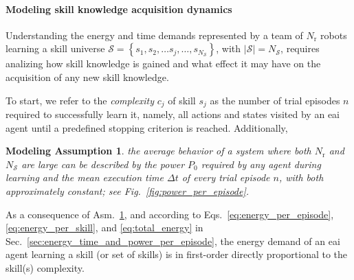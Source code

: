 \documentclass[12pt]{article}
\renewcommand{\emph}[1]{\textit{#1}}
\newtheorem{assumption}{Modeling Assumption}
\begin{document}
\paragraph*{Modeling skill knowledge acquisition dynamics}\label{sec:knowledge_dynamics_model}
Understanding the energy and time demands represented by a team of $N_\mathrm{r}$ robots learning a skill universe $\mathcal{S}=\left\lbrace s_1,s_2,\ldots s_j,\ldots, s_{N_\mathcal{S}}\right\rbrace$, with $|\mathcal{S}| = N_\mathcal{S}$, requires analizing how skill knowledge is gained and what effect it may have on the acquisition of any new skill knowledge. 

To start, we refer to the \emph{complexity} $c_j$ of skill $ s_j $ as the number of trial episodes $n$ required to successfully learn it, namely, all actions and states visited by an \ac{eai} agent until a predefined stopping criterion is reached. Additionally,
\begin{tcolorbox}
	\begin{assumption}\label{assumption:power_and_episode_time}
		the average behavior of a system where both $N_\mathrm{r}$ and $N_\mathcal{S}$ are large can be described by the power $P_0$ required by any agent during learning and the mean execution time $\Delta t$ of every trial episode $n$, with both approximately constant; see Fig.~\ref{fig:power_per_episode}.
	\end{assumption}
\end{tcolorbox}
\noindent As a consequence of Asm.~\ref{assumption:power_and_episode_time}, and according to Eqs.~\eqref{eq:energy_per_episode},\eqref{eq:energy_per_skill}, and \eqref{eq:total_energy} in Sec.~\ref{sec:energy_time_and_power_per_episode}, the energy demand of an \ac{eai} agent learning a skill (or set of skills) is in first-order directly proportional to the skill(s) complexity.
\end{document}
